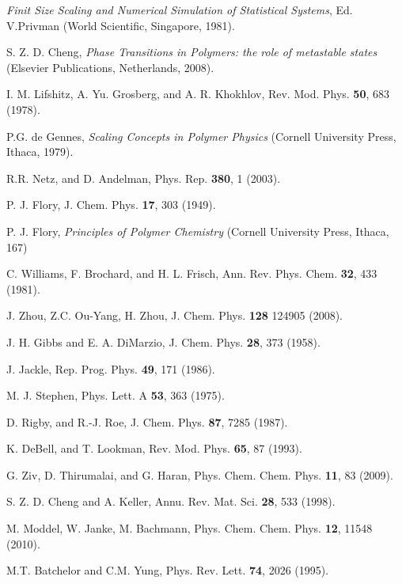 \documentclass[aps,pre,twocolumn,showpacs,preprintnumbers,amsmath,amssymb]{revtex4-1}
\begin{document}
\begin{thebibliography}{10}

{\it Finit Size Scaling and Numerical Simulation of Statistical Systems},
Ed. V.Privman (World Scientific, Singapore, 1981).


S. Z. D. Cheng, {\it Phase Transitions in Polymers: the role of
metastable states} (Elsevier Publications, Netherlands, 2008).

I. M. Lifshitz, A. Yu. Grosberg, and A. R. Khokhlov, Rev. Mod. Phys.
{\bf 50}, 683 (1978).

P.G. de Gennes, {\it Scaling Concepts in Polymer Physics} (Cornell
University Press, Ithaca, 1979).

R.R. Netz, and D. Andelman, Phys. Rep. {\bf 380}, 1 (2003).

P. J. Flory, J. Chem. Phys. {\bf 17}, 303 (1949).

P. J. Flory, {\it Principles of Polymer Chemistry} (Cornell University
Press, Ithaca, 167)

C. Williams, F. Brochard, and H. L. Frisch, Ann. Rev. Phys. Chem.
{\bf 32}, 433 (1981).

J. Zhou, Z.C. Ou-Yang, H. Zhou, J. Chem. Phys. {\bf 128}
124905 (2008).

J. H. Gibbs and E. A. DiMarzio, J. Chem. Phys. {\bf 28}, 373 (1958).

J. Jackle, Rep. Prog. Phys. {\bf 49}, 171 (1986).

M. J. Stephen, Phys. Lett. A {\bf 53}, 363 (1975).

D. Rigby, and R.-J. Roe, J. Chem. Phys. {\bf 87}, 7285 (1987).

K. DeBell, and T. Lookman, Rev. Mod. Phys. {\bf 65}, 87 (1993).

G. Ziv, D. Thirumalai, and G. Haran, Phys. Chem. Chem. Phys. {\bf 11},
83 (2009).

S. Z. D. Cheng and A. Keller, Annu. Rev. Mat. Sci. {\bf 28}, 533 (1998).



M. Moddel, W. Janke, M. Bachmann, Phys. Chem. Chem. Phys. {\bf 12},
11548 (2010).

M.T. Batchelor and C.M. Yung, Phys. Rev. Lett. {\bf 74}, 2026 (1995).


\end{thebibliography}
\end{document}
